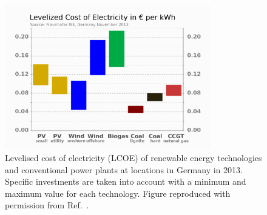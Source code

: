 \documentclass[11pt, twoside]{report}
\begin{document}
\begin{figure}[h!]
  \centering
    \includegraphics[width=0.8\textwidth]{figures/LCOE.png}
    \caption[Levelised cost of electricity (LCOE) of renewable energy technologies and conventional power plants at locations in Germany in 2013.  Specific investments are taken into account with a minimum and maximum value for each technology.]{Levelised cost of electricity (LCOE) of renewable energy technologies and conventional power plants at locations in Germany in 2013.  Specific investments are taken into account with a minimum and maximum value for each technology. Figure reproduced with permission from Ref.~.}
  \label{LCOE}
\end{figure}

\end{document}
